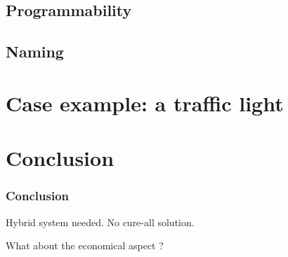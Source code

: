 \documentclass[utf8,xcolor=table, page number]{earlywinter}
\begin{document}
\subsection{Programmability}
\subsection{Naming}

\section{Case example: a traffic light}

\section{Conclusion}
\begin{frame}
  \frametitle{Conclusion}
  Hybrid system needed.
  No cure-all solution.
  
  What about the economical aspect ?
  
\end{frame}
\end{document}
